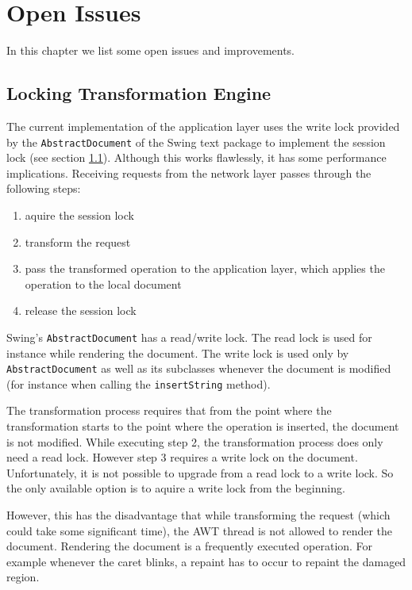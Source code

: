 \chapter{Open Issues}
\label{chapter:openissues}

In this chapter we list some open issues and improvements.


\section{Locking Transformation Engine}
The current implementation of the application layer uses the write lock
provided by the \texttt{Abstract\-Document} of the Swing 
text package to implement the session lock (see section \ref{}). 
Although this works flawlessly, it has some performance
implications. Receiving requests from the network layer passes through
the following steps:

\begin{enumerate}
 \item aquire the session lock
 \item transform the request
 \item pass the transformed operation to the application layer, which applies
       the operation to the local document
 \item release the session lock
\end{enumerate}

Swing's \texttt{Abstract\-Document} has a read/write lock. The read lock
is used for instance while rendering the document. The write lock is used
only by \texttt{Abstract\-Document} as well as its subclasses whenever the
document is modified (for instance when calling the \texttt{insert\-String}
method).

The transformation process requires that from the point where the transformation
starts to the point where the operation is inserted, the document is not 
modified. While executing step 2, the transformation process does only
need a read lock. However step 3 requires a write lock on the document.
Unfortunately, it is not possible to upgrade from a read lock to a write
lock. So the only available option is to aquire a write lock from the
beginning.

However, this has the disadvantage that while transforming
the request (which could take some significant time), the AWT thread is
not allowed to render the document. Rendering the document is a 
frequently executed operation. For example whenever the caret blinks, a
repaint has to occur to repaint the damaged region.

